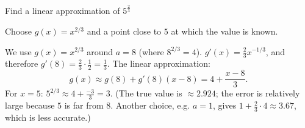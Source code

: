 
\begin{question}
Find a linear approximation of $5^{\frac{2}{3}}$
\end{question}

\begin{hint}
Choose $g(x)=x^{2/3}$ and a point close to $5$ at which the value is known.
\end{hint}

\begin{solution}
We use $g(x)=x^{2/3}$ around $a=8$ (where $8^{2/3}=4$). $g'(x)=\frac23x^{-1/3}$, and therefore $g'(8)=\frac23\cdot\frac12=\frac13$. The linear approximation:
\[ g(x)\approx g(8)+g'(8)(x-8)=4+\frac{x-8}{3}. \]
For $x=5$: $5^{2/3}\approx4+\frac{-3}{3}=\boxed{3}$.
(The true value is $\approx2.924$; the error is relatively large because $5$ is far from $8$. Another choice, e.g. $a=1$, gives $1+\frac23\cdot4\approx3.67$, which is less accurate.)
\end{solution}
